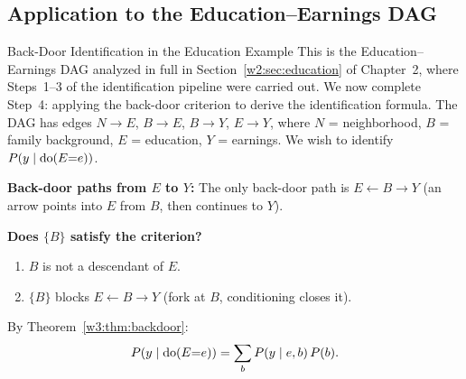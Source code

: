 \documentclass[master.tex]{subfiles}
\begin{document}
\subsection{Application to the Education--Earnings DAG}
\label{w3:sec:education-ex}
\begin{example}{Back-Door Identification in the Education Example}
\label{w3:ex:education}
This is the Education--Earnings DAG analyzed in full in
Section~\ref{w2:sec:education} of Chapter~2, where Steps~1--3 of the
identification pipeline were carried out.  We now complete Step~4: applying the back-door criterion to
derive the identification formula.  The DAG has edges $N \to E$, $B \to E$,
$B \to Y$, $E \to Y$, where $N$ = neighborhood, $B$ = family background,
$E$ = education, $Y$ = earnings.  We wish to identify
$P(y \mid \mathrm{do}(E{=}e))$.

\begin{center}
\end{center}

\medskip\noindent
\textbf{Back-door paths from $E$ to $Y$:}
The only back-door path is $E \leftarrow B \to Y$ (an arrow points into
$E$ from $B$, then continues to $Y$).

\medskip\noindent
\textbf{Does $\{B\}$ satisfy the criterion?}
\begin{enumerate}
  \item $B$ is not a descendant of $E$. \checkmark
  \item $\{B\}$ blocks $E \leftarrow B \to Y$ (fork at $B$,
        conditioning closes it). \checkmark
\end{enumerate}
By Theorem~\ref{w3:thm:backdoor}:
\[
  P(y \mid \mathrm{do}(E{=}e)) = \sum_b P(y \mid e, b)\,P(b).
\]


\end{example}
\end{document}
